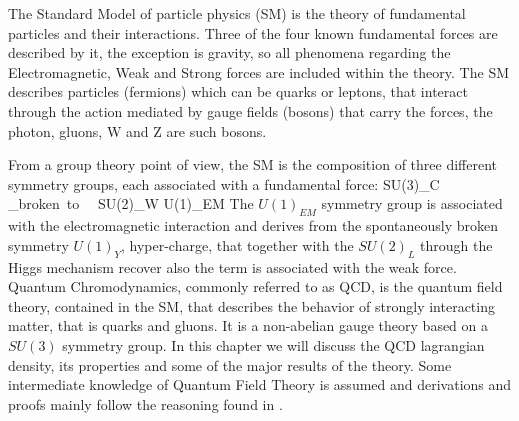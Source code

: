 The Standard Model of particle physics (SM) is the theory of fundamental particles and their interactions. Three of the four known fundamental forces are described by it, the exception is gravity, so all phenomena regarding the Electromagnetic, Weak and Strong forces are included within the theory. The SM describes particles (fermions) which can be quarks or leptons, that interact through the action mediated by gauge fields (bosons) that carry the forces, the photon, gluons, W and Z are such bosons.\\ 
\begin{center}
  
\end{center}
From a group theory point of view, the SM is the composition of three different symmetry groups, each associated with a fundamental force:
\beq
    SU(3)_C \times {}_{broken~to~~ SU(2)_W \times U(1)_{EM}}
\eeq
The $U(1)_{EM}$ symmetry group is associated with the electromagnetic interaction and derives from the spontaneously broken symmetry $U(1)_{Y}$, hyper-charge, that together with the $SU(2)_L$ through the Higgs mechanism recover also the term is associated with the weak force.\\ 
Quantum Chromodynamics, commonly referred to as QCD, is the quantum field theory, contained in the SM, that describes the behavior of strongly interacting matter, that is quarks and gluons. It is a non-abelian gauge theory based on a $SU(3)$ symmetry group. In this chapter we will discuss the QCD lagrangian density, its properties and some of the major results of the theory. Some intermediate knowledge of Quantum Field Theory is assumed and derivations and proofs mainly follow the reasoning found in \cite{peskin}.

